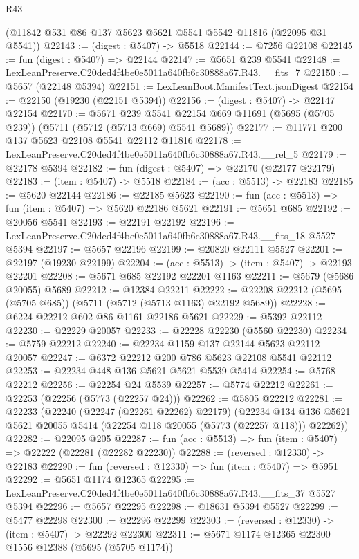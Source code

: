 \begin{lexlean}{R43}
\begin{coremodule}
    (@11842 @531 @86 @137 @5623 @5621 @5541 @5542 @11816 (@22095 @31 @5541))
@22143 := (digest : @5407) -> @5518
@22144 := @7256 @22108
@22145 := fun (digest : @5407) => @22144
@22147 := @5651 @239 @5541
@22148 := LexLeanPreserve.C20ded4f4be0e5011a640fb6c30888a67.R43.__fits_7
@22150 := @5657 (@22148 @5394)
@22151 := LexLeanBoot.ManifestText.jsonDigest
@22154 := @22150 (@19230 (@22151 @5394))
@22156 := (digest : @5407) -> @22147 @22154
@22170 := @5671
    @239
    @5541
    @22154
    @669
    @11691
    (@5695 (@5705 @239))
    (@5711 (@5712 (@5713 @669) @5541 @5689))
@22177 := @11771 @200 @137 @5623 @22108 @5541 @22112 @11816
@22178 := LexLeanPreserve.C20ded4f4be0e5011a640fb6c30888a67.R43.__rel_5
@22179 := @22178 @5394
@22182 := fun (digest : @5407) => @22170 (@22177 @22179)
@22183 := (item : @5407) -> @5518
@22184 := (acc : @5513) -> @22183
@22185 := @5620 @22144
@22186 := @22185 @5623
@22190 := fun (acc : @5513) => fun (item : @5407) => @5620 @22186 @5621
@22191 := @5651 @685
@22192 := @20056 @5541
@22193 := @22191 @22192
@22196 := LexLeanPreserve.C20ded4f4be0e5011a640fb6c30888a67.R43.__fits_18 @5527 @5394
@22197 := @5657 @22196
@22199 := @20820 @22111 @5527
@22201 := @22197 (@19230 @22199)
@22204 := (acc : @5513) -> (item : @5407) -> @22193 @22201
@22208 := @5671 @685 @22192 @22201 @1163
@22211 := @5679 (@5686 @20055) @5689
@22212 := @12384 @22211
@22222 := @22208 @22212 (@5695 (@5705 @685)) (@5711 (@5712 (@5713 @1163) @22192 @5689))
@22228 := @6224 @22212 @602 @86 @1161 @22186 @5621
@22229 := @5392 @22112
@22230 := @22229 @20057
@22233 := @22228 @22230 (@5560 @22230)
@22234 := @5759 @22212
@22240 := @22234 @1159 @137 @22144 @5623 @22112 @20057
@22247 := @6372 @22212 @200 @786 @5623 @22108 @5541 @22112
@22253 := @22234 @448 @136 @5621 @5621 @5539 @5414
@22254 := @5768 @22212
@22256 := @22254 @24 @5539
@22257 := @5774 @22212
@22261 := @22253 (@22256 (@5773 (@22257 @24)))
@22262 := @5805 @22212
@22281 := @22233
    (@22240
      (@22247 (@22261 @22262) @22179)
      (@22234 @134 @136 @5621 @5621 @20055 @5414 (@22254 @118 @20055 (@5773 (@22257 @118))) @22262))
@22282 := @22095 @205
@22287 := fun (acc : @5513) => fun (item : @5407) => @22222 (@22281 (@22282 @22230))
@22288 := (reversed : @12330) -> @22183
@22290 := fun (reversed : @12330) => fun (item : @5407) => @5951
@22292 := @5651 @1174 @12365
@22295 := LexLeanPreserve.C20ded4f4be0e5011a640fb6c30888a67.R43.__fits_37 @5527 @5394
@22296 := @5657 @22295
@22298 := @18631 @5394 @5527
@22299 := @5477 @22298
@22300 := @22296 @22299
@22303 := (reversed : @12330) -> (item : @5407) -> @22292 @22300
@22311 := @5671 @1174 @12365 @22300 @1556 @12388 (@5695 (@5705 @1174))

\end{coremodule}
\end{lexlean}
